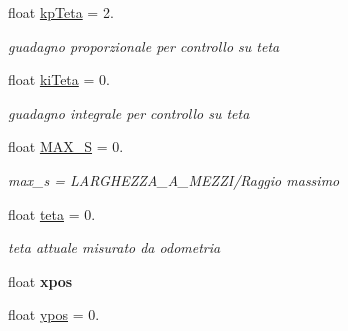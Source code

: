 \begin{DoxyCompactItemize}
\mbox{\label{ari_pi__2_d_c__esp__08_8ino_a6f825712ede5cd29e0ee8a3b8603fa5f}} 
float \mbox{\hyperlink{ari_pi__2_d_c__esp__08_8ino_a6f825712ede5cd29e0ee8a3b8603fa5f}{kp\+Teta}} = 2.
\begin{DoxyCompactList}\small\item\em guadagno proporzionale per controllo su teta \end{DoxyCompactList}\item 
\mbox{\label{ari_pi__2_d_c__esp__08_8ino_ad59a70cc86150e574e73066bf9b92062}} 
float \mbox{\hyperlink{ari_pi__2_d_c__esp__08_8ino_ad59a70cc86150e574e73066bf9b92062}{ki\+Teta}} = 0.
\begin{DoxyCompactList}\small\item\em guadagno integrale per controllo su teta \end{DoxyCompactList}\item 
\mbox{\label{ari_pi__2_d_c__esp__08_8ino_a33a1abc735507147bab601374a138b09}} 
float \mbox{\hyperlink{ari_pi__2_d_c__esp__08_8ino_a33a1abc735507147bab601374a138b09}{M\+A\+X\+\_\+S}} = 0.
\begin{DoxyCompactList}\small\item\em max\+\_\+s = L\+A\+R\+G\+H\+E\+Z\+Z\+A\+\_\+\+A\+\_\+\+M\+E\+Z\+Z\+I/\+Raggio massimo \end{DoxyCompactList}\item 
\mbox{\label{ari_pi__2_d_c__esp__08_8ino_aa1cebdc383b21b594c09df4f1d035286}} 
float \mbox{\hyperlink{ari_pi__2_d_c__esp__08_8ino_aa1cebdc383b21b594c09df4f1d035286}{teta}} = 0.
\begin{DoxyCompactList}\small\item\em teta attuale misurato da odometria \end{DoxyCompactList}\item 
\mbox{\label{ari_pi__2_d_c__esp__08_8ino_adad239fcacf5c59997872bd0c12bdfd1}} 
float {\bfseries xpos}
\item 
\mbox{\label{ari_pi__2_d_c__esp__08_8ino_adb369a2ec52b1f831cf362b570df40d2}} 
float \mbox{\hyperlink{ari_pi__2_d_c__esp__08_8ino_adb369a2ec52b1f831cf362b570df40d2}{ypos}} = 0.

\end{DoxyCompactItemize}
